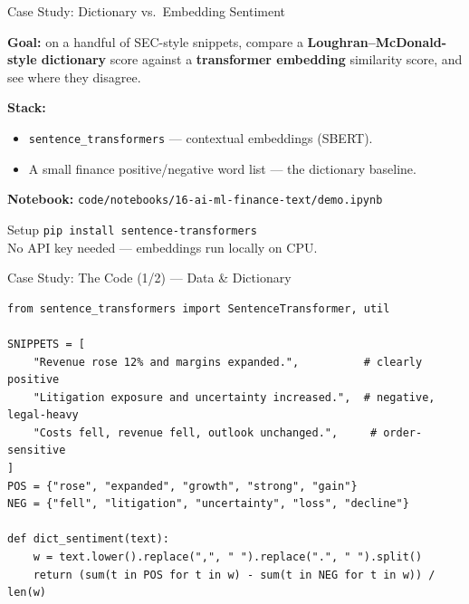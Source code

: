 \documentclass[9pt,t]{beamer}
\begin{document}
\begin{frame}{Case Study: Dictionary vs.\ Embedding Sentiment}

\textbf{Goal:} on a handful of SEC-style snippets, compare a
\textbf{Loughran--McDonald-style dictionary} score against a \textbf{transformer
embedding} similarity score, and see where they disagree.

\medskip
\textbf{Stack:}
\begin{itemize}
  \item \texttt{sentence\_transformers} --- contextual embeddings (SBERT).
  \item A small finance positive/negative word list --- the dictionary baseline.
\end{itemize}

\medskip
\textbf{Notebook:} \texttt{code/notebooks/16-ai-ml-finance-text/demo.ipynb}

\medskip
\begin{alertblock}{Setup}
\texttt{pip install sentence-transformers}\\
No API key needed --- embeddings run locally on CPU.
\end{alertblock}
\end{frame}

\begin{frame}[fragile]{Case Study: The Code (1/2) --- Data \& Dictionary}

\begin{lstlisting}
from sentence_transformers import SentenceTransformer, util

SNIPPETS = [
    "Revenue rose 12% and margins expanded.",          # clearly positive
    "Litigation exposure and uncertainty increased.",  # negative, legal-heavy
    "Costs fell, revenue fell, outlook unchanged.",     # order-sensitive
]
POS = {"rose", "expanded", "growth", "strong", "gain"}
NEG = {"fell", "litigation", "uncertainty", "loss", "decline"}

def dict_sentiment(text):
    w = text.lower().replace(",", " ").replace(".", " ").split()
    return (sum(t in POS for t in w) - sum(t in NEG for t in w)) / len(w)
\end{lstlisting}
\end{frame}
\end{document}
